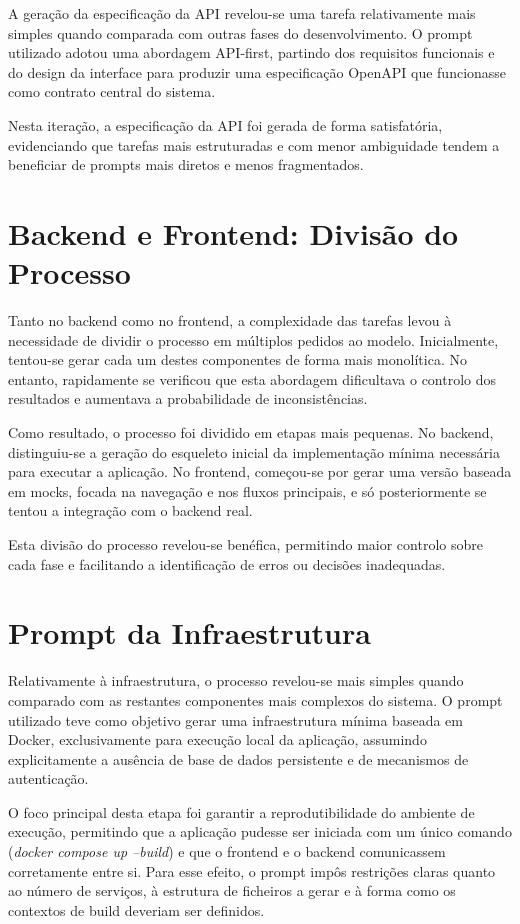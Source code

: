 A geração da especificação da API revelou-se uma tarefa relativamente mais simples quando comparada com outras fases do desenvolvimento. O prompt utilizado adotou uma abordagem API-first, partindo dos requisitos funcionais e do design da interface para produzir uma especificação OpenAPI que funcionasse como contrato central do sistema.

Nesta iteração, a especificação da API foi gerada de forma satisfatória, evidenciando que tarefas mais estruturadas e com menor ambiguidade tendem a beneficiar de prompts mais diretos e menos fragmentados.

\section{Backend e Frontend: Divisão do Processo}

Tanto no backend como no frontend, a complexidade das tarefas levou à necessidade de dividir o processo em múltiplos pedidos ao modelo. Inicialmente, tentou-se gerar cada um destes componentes de forma mais monolítica. No entanto, rapidamente se verificou que esta abordagem dificultava o controlo dos resultados e aumentava a probabilidade de inconsistências.

Como resultado, o processo foi dividido em etapas mais pequenas. No backend, distinguiu-se a geração do esqueleto inicial da implementação mínima necessária para executar a aplicação. No frontend, começou-se por gerar uma versão baseada em mocks, focada na navegação e nos fluxos principais, e só posteriormente se tentou a integração com o backend real.

Esta divisão do processo revelou-se benéfica, permitindo maior controlo sobre cada fase e facilitando a identificação de erros ou decisões inadequadas.

\section{Prompt da Infraestrutura}

Relativamente à infraestrutura, o processo revelou-se mais simples quando comparado com as restantes componentes mais complexos do sistema. O prompt utilizado teve como objetivo gerar uma infraestrutura mínima baseada em Docker, exclusivamente para execução local da aplicação, assumindo explicitamente a ausência de base de dados persistente e de mecanismos de autenticação.

O foco principal desta etapa foi garantir a reprodutibilidade do ambiente de execução, permitindo que a aplicação pudesse ser iniciada com um único comando (\textit{docker compose up --build}) e que o frontend e o backend comunicassem corretamente entre si. Para esse efeito, o prompt impôs restrições claras quanto ao número de serviços, à estrutura de ficheiros a gerar e à forma como os contextos de build deveriam ser definidos.

